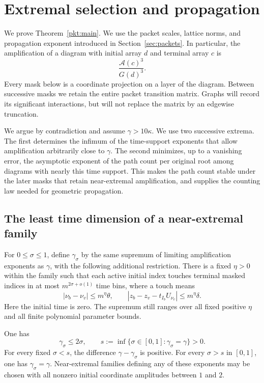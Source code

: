 \section{Extremal selection and propagation}\label{sec:extremal}

We prove Theorem~\ref{pkt:main}. We use the packet scales, lattice norms, and
propagation exponent introduced in Section~\ref{sec:packets}. In particular,
the amplification of a diagram with initial array \(d\) and terminal array
\(c\) is
\[
                 \frac{\mathcal A(c)^3}{G(d)^3}.
\]
Every mask below is a coordinate projection on a layer of the diagram.
Between successive masks we retain the entire packet transition matrix.
Graphs will record its significant interactions, but will not replace the
matrix by an edgewise truncation.

We argue by contradiction and assume \(\gamma>10\kappa\).
We use two successive extrema. The first determines the infimum of
the time-support exponents that allow amplification arbitrarily close
to \(\gamma\). The second minimizes, up to a vanishing error, the
asymptotic exponent of the path count per original root among diagrams
with nearly this time support. This makes the path count stable under
the later masks that retain near-extremal amplification, and supplies
the counting law needed for geometric propagation.

\subsection{The least time dimension of a near-extremal family}

For \(0\leq \sigma\leq1\), define \(\gamma_\sigma\) by the same supremum
of limiting amplification exponents as \(\gamma\), with the following
additional restriction. There is a fixed \(\eta>0\) within the family
such that each active initial index touches terminal masked indices in
at most \(m^{2\sigma+o(1)}\) time bins, where a touch means
\[
 |\nu_b-\nu_v|\leq m^\eta\theta,
 \qquad
 |z_b-z_v-t_{I_b}U_{\nu_v}|\leq m^\eta\delta .
\]
Here the initial time is zero. The supremum still ranges over all fixed
positive \(\eta\) and all finite polynomial parameter bounds.

\begin{lemma}\label{ext:time-dimension}
One has
\begin{equation}\label{eq:source-34}
 \gamma_\sigma\leq 2\sigma,
 \qquad
 s:=\inf\{\sigma\in[0,1]:\gamma_\sigma=\gamma\}>0 .
\end{equation}
For every fixed \(\sigma<s\), the difference
\(\gamma-\gamma_\sigma\) is positive. For every \(\sigma>s\) in
\([0,1]\), one has \(\gamma_\sigma=\gamma\).
Near-extremal families defining any of these exponents may be chosen
with all nonzero initial coordinate amplitudes between \(1\) and \(2\).
\end{lemma}

